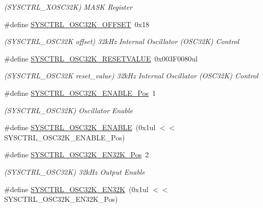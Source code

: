 \begin{DoxyCompactItemize}
\begin{DoxyCompactList}\small\item\em (S\+Y\+S\+C\+T\+R\+L\+\_\+\+X\+O\+S\+C32K) M\+A\+SK Register \end{DoxyCompactList}\item 
\#define \mbox{\hyperlink{group___s_a_m_d21___s_y_s_c_t_r_l_gaf4750e0c8147b238c318c081926b980a}{S\+Y\+S\+C\+T\+R\+L\+\_\+\+O\+S\+C32\+K\+\_\+\+O\+F\+F\+S\+ET}}~0x18
\begin{DoxyCompactList}\small\item\em (S\+Y\+S\+C\+T\+R\+L\+\_\+\+O\+S\+C32K offset) 32k\+Hz Internal Oscillator (O\+S\+C32K) Control \end{DoxyCompactList}\item 
\#define \mbox{\hyperlink{group___s_a_m_d21___s_y_s_c_t_r_l_ga161fc254f3c5ff91f2af85a52b863156}{S\+Y\+S\+C\+T\+R\+L\+\_\+\+O\+S\+C32\+K\+\_\+\+R\+E\+S\+E\+T\+V\+A\+L\+UE}}~0x003\+F0080ul
\begin{DoxyCompactList}\small\item\em (S\+Y\+S\+C\+T\+R\+L\+\_\+\+O\+S\+C32K reset\+\_\+value) 32k\+Hz Internal Oscillator (O\+S\+C32K) Control \end{DoxyCompactList}\item 
\#define \mbox{\hyperlink{group___s_a_m_d21___s_y_s_c_t_r_l_gaca04b5d34a554ce05a4476d85f6c58e8}{S\+Y\+S\+C\+T\+R\+L\+\_\+\+O\+S\+C32\+K\+\_\+\+E\+N\+A\+B\+L\+E\+\_\+\+Pos}}~1
\begin{DoxyCompactList}\small\item\em (S\+Y\+S\+C\+T\+R\+L\+\_\+\+O\+S\+C32K) Oscillator Enable \end{DoxyCompactList}\item 
\#define \mbox{\hyperlink{group___s_a_m_d21___s_y_s_c_t_r_l_ga4e537b93cb27731aa53877401e00bac2}{S\+Y\+S\+C\+T\+R\+L\+\_\+\+O\+S\+C32\+K\+\_\+\+E\+N\+A\+B\+LE}}~(0x1ul $<$$<$ S\+Y\+S\+C\+T\+R\+L\+\_\+\+O\+S\+C32\+K\+\_\+\+E\+N\+A\+B\+L\+E\+\_\+\+Pos)
\item 
\#define \mbox{\hyperlink{group___s_a_m_d21___s_y_s_c_t_r_l_gaf9831241d8655e09b03848660627ad52}{S\+Y\+S\+C\+T\+R\+L\+\_\+\+O\+S\+C32\+K\+\_\+\+E\+N32\+K\+\_\+\+Pos}}~2
\begin{DoxyCompactList}\small\item\em (S\+Y\+S\+C\+T\+R\+L\+\_\+\+O\+S\+C32K) 32k\+Hz Output Enable \end{DoxyCompactList}\item 
\#define \mbox{\hyperlink{group___s_a_m_d21___s_y_s_c_t_r_l_ga6b784b9d76f42e9634486750ddf716ad}{S\+Y\+S\+C\+T\+R\+L\+\_\+\+O\+S\+C32\+K\+\_\+\+E\+N32K}}~(0x1ul $<$$<$ S\+Y\+S\+C\+T\+R\+L\+\_\+\+O\+S\+C32\+K\+\_\+\+E\+N32\+K\+\_\+\+Pos)

\end{DoxyCompactItemize}

